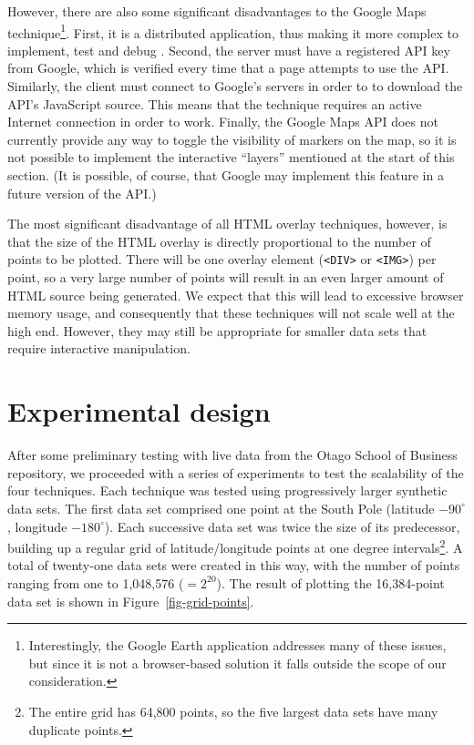 \documentclass[acmnow]{acmtrans2m}
\begin{document}
However, there are also some significant disadvantages to the Google
Maps technique\footnote{Interestingly, the Google Earth application
addresses many of these issues, but since it is not a browser-based
solution it falls outside the scope of our consideration.}. First, it is
a distributed application, thus making it more complex to implement,
test and debug \cite{Bates-PC-1995-distdebug,Ensl-PH-1978-distributed}.
Second, the server must have a registered API key from Google, which is
verified every time that a page attempts to use the API. Similarly, the
client must connect to Google's servers in order to to download the
API's JavaScript source. This means that the technique requires an
active Internet connection in order to work. Finally, the Google Maps
API does not currently provide any way to toggle the visibility of
markers on the map, so it is not possible to implement the interactive
``layers'' mentioned at the start of this section. (It is possible, of
course, that Google may implement this feature in a future version of
the API.)

The most significant disadvantage of all HTML overlay techniques,
however, is that the size of the HTML overlay is directly proportional
to the number of points to be plotted. There will be one overlay element
(\verb|<DIV>| or \verb|<IMG>|) per point, so a very large number of
points will result in an even larger amount of HTML source being
generated. We expect that this will lead to excessive browser memory
usage, and consequently that these techniques will not scale well at the
high end. However, they may still be appropriate for smaller data sets
that require interactive manipulation.


\section{Experimental design}
\label{sec-experiment}

After some preliminary testing with live data from the Otago School of
Business repository, we proceeded with a series of experiments to test
the scalability of the four techniques. Each technique was tested using
progressively larger synthetic data sets. The first data set comprised
one point at the South Pole (latitude \(-90^{\circ}\), longitude
\(-180^{\circ}\)). Each successive data set was twice the size of its
predecessor, building up a regular grid of latitude/longitude points at
one degree intervals\footnote{The entire grid has 64,800 points, so the
five largest data sets have many duplicate points.}. A total of
twenty-one data sets were created in this way, with the number of points
ranging from one to 1,048,576 (\(=2^{20}\)). The result of plotting the
16,384-point data set is shown in Figure~\ref{fig-grid-points}.
\end{document}
